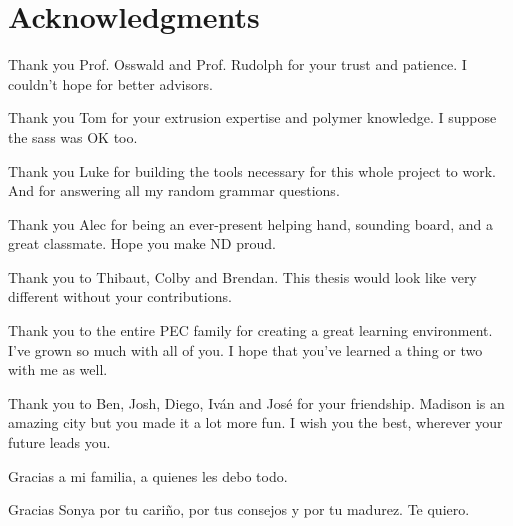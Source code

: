 \documentclass[main.tex]{subfiles}
\begin{document}
\chapter*{Acknowledgments}
{
\setlength{\parindent}{0cm}
\setlength{\parskip}{12pt}
Thank you Prof. Osswald and Prof. Rudolph for your trust and patience. I couldn't hope for better advisors.
     
Thank you Tom for your extrusion expertise and polymer knowledge. I suppose the sass was OK too.

Thank you Luke for building the tools necessary for this whole project to work. And for answering all my random grammar questions.

Thank you Alec for being an ever-present helping hand, sounding board, and a great classmate. Hope you make ND proud.

Thank you to Thibaut, Colby and Brendan. This thesis would look like very different without your contributions.
    
Thank you to the entire PEC family for creating a great learning environment. I've grown so much with all of you. I hope that you've learned a thing or two with me as well.

Thank you to Ben, Josh, Diego, Iv\'an and Jos\'e for your friendship. Madison is an amazing city but you made it a lot more fun. I wish you the best, wherever your future leads you.

Gracias a mi familia, a quienes les debo todo.

Gracias Sonya por tu cari\~no, por tus consejos y por tu madurez. Te quiero.  
}
\end{document}
